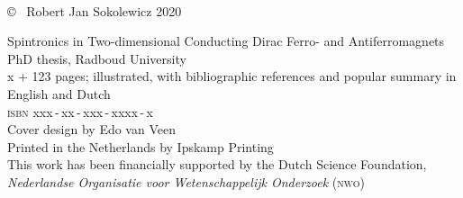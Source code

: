 \frenchspacing
\raggedbottom

\thispagestyle{empty}
\vspace*{4em}
\begin{center}
\huge{}\\
\end{center}
\newpage

\thispagestyle{empty}
\null
\vfill

\setlength{\marginparwidth}{2em}
\setlength{\marginparsep}{0.75em}

\noindent \copyright~ Robert Jan Sokolewicz 2020


\noindent Spintronics in Two-dimensional Conducting Dirac Ferro- and Antiferromagnets\\
PhD thesis, Radboud University\\[1ex]
x + 123 pages; illustrated, with bibliographic references  and popular summary in English and Dutch\\[2ex]
{\scshape isbn} \quad xxx\,-\,xx\,-\,xxx\,-\,xxxx\,-\,x\\[2ex]
Cover design by Edo van Veen\\
Printed in the Netherlands by Ipskamp Printing\\[2ex]
This work has been financially supported by  the Dutch Science Foundation, \emph{Nederlandse Organisatie voor Wetenschappelijk Onderzoek} \textsc{(nwo)} 


